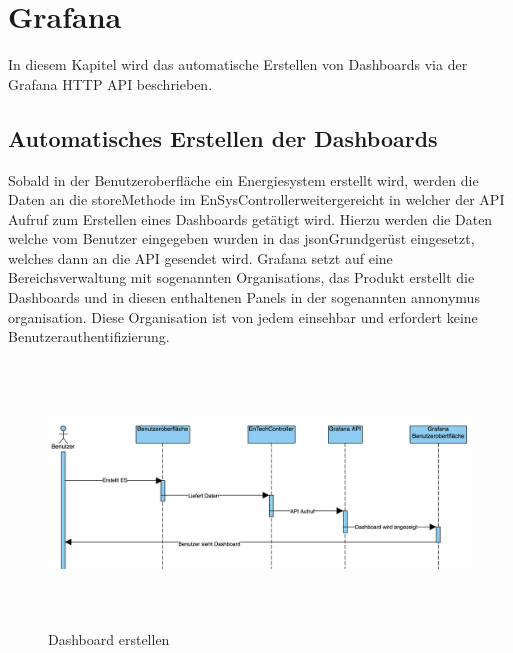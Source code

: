 \newpage
\section{Grafana}
In diesem Kapitel wird das automatische Erstellen von Dashboards via der Grafana HTTP API beschrieben. 

\subsection{Automatisches Erstellen der Dashboards} \label{sec: Dashboard}
Sobald in der Benutzeroberfläche ein Energiesystem erstellt wird, werden die Daten an die \glqq store\grqq \space Methode im \glqq EnSysController\grqq \space weitergereicht in welcher der API Aufruf zum Erstellen eines Dashboards getätigt wird. Hierzu werden die Daten welche vom Benutzer eingegeben wurden in das \glqq json\grqq \space Grundgerüst eingesetzt, welches dann an die API gesendet wird. Grafana setzt auf eine Bereichsverwaltung mit sogenannten \glqq Organisations\grqq \space, das Produkt erstellt die Dashboards und in diesen enthaltenen Panels in der sogenannten \glqq annonymus organisation\grqq \space. Diese Organisation ist von jedem einsehbar und erfordert keine Benutzerauthentifizierung. 
\begin{figure}[h]
	\centering
	\includegraphics[height=7cm,width=16cm]{images/GrafanaESerstellen}
	\caption{Dashboard erstellen}
	\label{fig:DashboardErstellen }
\end{figure}


